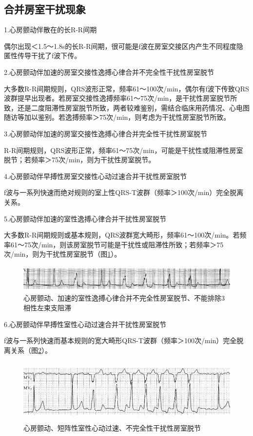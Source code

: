 \subsection{合并房室干扰现象}

1.心房颤动伴散在的长R-R间期

偶尔出现＜1.5～1.8s的长R-R间期，很可能是f波在房室交接区内产生不同程度隐匿性传导干扰了f波下传。

2.心房颤动伴加速的房室交接性逸搏心律合并不完全性干扰性房室脱节

大多数R-R间期规则，QRS波形正常，频率61～100次/min，偶尔有f波下传致QRS波群提早出现者。若房室交接性逸搏频率61～75次/min，是干扰性房室脱节所致，还是二度阻滞性房室脱节所致，两者较难鉴别，需结合临床用药情况、心电图随访等加以鉴别。若逸搏频率＞75次/min，则考虑为干扰性房室脱节所致。

3.心房颤动伴加速的房室交接性逸搏心律合并完全性干扰性房室脱节

R-R间期规则，QRS波形正常，频率61～75次/min，可能是干扰性或阻滞性房室脱节；若频率＞75次/min，则为干扰性房室脱节。

4.心房颤动伴早搏性房室交接性心动过速合并干扰性房室脱节

f波与一系列快速而绝对规则的室上性QRS-T波群（频率＞100次/min）完全脱离关系。

5.心房颤动伴加速的室性逸搏心律合并干扰性房室脱节

大多数R-R间期规则或基本规则，QRS波群宽大畸形，频率61～100次/min。若频率61～75次/min，则该房室脱节可能是干扰性或阻滞性所致；若频率＞75次/min，则为干扰性房室脱节（图\ref{fig13-22}）。

\begin{figure}[!htbp]
 \centering
 \includegraphics[width=5.58333in,height=0.54167in]{./images/Image00230.jpg}
 \captionsetup{justification=centering}
 \caption{心房颤动、加速的室性逸搏心律合并不完全性房室脱节、不能排除3相性左束支阻滞}
 \label{fig13-22}
  \end{figure} 

6.心房颤动伴早搏性室性心动过速合并干扰性房室脱节

f波与一系列快速而基本规则的宽大畸形QRS-T波群（频率＞100次/min）完全脱离关系（图\ref{fig13-23}）。

\begin{figure}[!htbp]
 \centering
 \includegraphics[width=5.58333in,height=1.26042in]{./images/Image00231.jpg}
 \captionsetup{justification=centering}
 \caption{心房颤动、短阵性室性心动过速、不完全性干扰性房室脱节}
 \label{fig13-23}
  \end{figure} 

